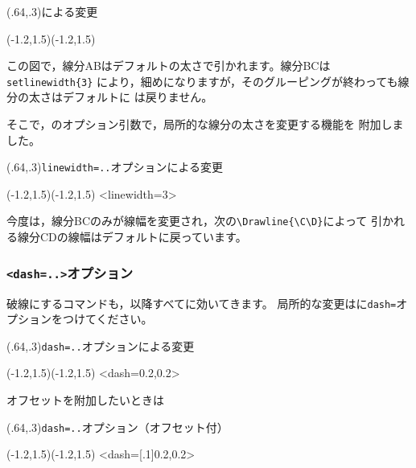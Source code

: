 \documentclass[a4j]{jarticle}
\begin{document}
\begin{showEx}(.64,.3){による変更}
\begin{pszahyou}[ul=10mm](-1.2,1.5)(-1.2,1.5)
  \Drawline{\A\B}
{%
  \Drawline{\B\C}
}%
  \Drawline{\C\D}
\end{pszahyou}
\end{showEx}

この図で，線分ABはデフォルトの太さで引かれます。線分BCは\verb+setlinewidth{3}+
により，細めになりますが，そのグルーピングが終わっても線分の太さはデフォルトに
は戻りません。

そこで，のオプション引数で，局所的な線分の太さを変更する機能を
附加しました。

\begin{showEx}(.64,.3){\texttt{linewidth=..}オプションによる変更}
\begin{pszahyou}[ul=10mm](-1.2,1.5)(-1.2,1.5)
  \Drawline{\A\B}
  \Drawline<linewidth=3>{\B\C}
  \Drawline{\C\D}
\end{pszahyou}
\end{showEx}

今度は，線分BCのみが線幅を変更され，次の\verb+\Drawline{\C\D}+によって
引かれる線分CDの線幅はデフォルトに戻っています。

\subsubsection{\texttt{<dash=..>}オプション}
破線にするコマンドも，以降すべてに効いてきます。
局所的な変更はに\texttt{dash=}オプションをつけてください。

\begin{showEx}(.64,.3){\texttt{dash=..}オプションによる変更}
\begin{pszahyou}[ul=10mm](-1.2,1.5)(-1.2,1.5)
  \Drawline{\A\B}
  \Drawline<dash={0.2,0.2}>{\B\C}
  \Drawline{\C\D}
\end{pszahyou}
\end{showEx}

オフセットを附加したいときは

\begin{showEx}(.64,.3){\texttt{dash=..}オプション（オフセット付）}
\begin{pszahyou}[ul=10mm](-1.2,1.5)(-1.2,1.5)
  \Drawline{\A\B}
  \Drawline<dash=[.1]{0.2,0.2}>{\B\C}
  \Drawline{\C\D}
\end{pszahyou}
\end{showEx}
\end{document}
